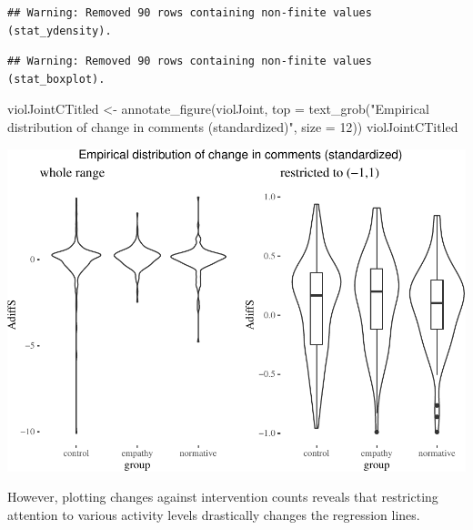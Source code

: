 \documentclass[
  10pt,
  dvipsnames,enabledeprecatedfontcommands]{scrartcl}
\newenvironment{Shaded}{\begin{snugshade}}{\end{snugshade}}
\newcommand{\AttributeTok}[1]{\textcolor[rgb]{0.77,0.63,0.00}{#1}}
\newcommand{\DecValTok}[1]{\textcolor[rgb]{0.00,0.00,0.81}{#1}}
\newcommand{\FunctionTok}[1]{\textcolor[rgb]{0.00,0.00,0.00}{#1}}
\newcommand{\NormalTok}[1]{#1}
\newcommand{\OtherTok}[1]{\textcolor[rgb]{0.56,0.35,0.01}{#1}}
\newcommand{\StringTok}[1]{\textcolor[rgb]{0.31,0.60,0.02}{#1}}
\begin{document}
\begin{verbatim}
## Warning: Removed 90 rows containing non-finite values (stat_ydensity).
\end{verbatim}

\begin{verbatim}
## Warning: Removed 90 rows containing non-finite values (stat_boxplot).
\end{verbatim}

\begin{Shaded}
\begin{Highlighting}[]
\NormalTok{violJointCTitled }\OtherTok{\textless{}{-}} \FunctionTok{annotate\_figure}\NormalTok{(violJoint, }
  \AttributeTok{top =} \FunctionTok{text\_grob}\NormalTok{(}\StringTok{"Empirical distribution of change in comments (standardized)"}\NormalTok{,}
                  \AttributeTok{size =} \DecValTok{12}\NormalTok{))}
\NormalTok{violJointCTitled}
\end{Highlighting}
\end{Shaded}

\begin{center}\includegraphics[width=1\linewidth]{bayesianReport3_files/figure-latex/violEpmiricalCdiff-1} \end{center}
\normalsize

However, plotting changes against intervention counts reveals that
restricting attention to various activity levels drastically changes the
regression lines.

\vspace{1mm}
\footnotesize
\end{document}
